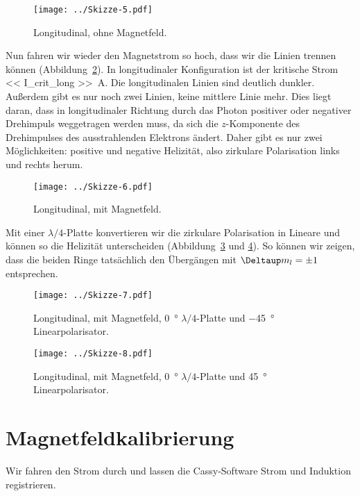 \begin{figure}[htbp]
    \centering
    \texttt{[image: ../Skizze-5.pdf]}
    \caption{%
        Longitudinal, ohne Magnetfeld.
    }
    \label{fig:Skizze-5}
\end{figure}

Nun fahren wir wieder den Magnetstrom so hoch, dass wir die Linien trennen
können (Abbildung~\ref{fig:Skizze-6}). In longitudinaler Konfiguration ist der
kritische Strom \SI{<< I_crit_long >>}{\ampere}. Die longitudinalen Linien sind
deutlich dunkler. Außerdem gibt es nur noch zwei Linien, keine mittlere Linie
mehr. Dies liegt daran, dass in longitudinaler Richtung durch das Photon
positiver oder negativer Drehimpuls weggetragen werden muss, da sich die
$z$-Komponente des Drehimpulses des ausstrahlenden Elektrons ändert. Daher gibt
es nur zwei Möglichkeiten: positive und negative Helizität, also zirkulare
Polarisation links und rechts herum.

\begin{figure}[htbp]
    \centering
    \texttt{[image: ../Skizze-6.pdf]}
    \caption{%
        Longitudinal, mit Magnetfeld.
    }
    \label{fig:Skizze-6}
\end{figure}

Mit einer $\lambda/4$-Platte konvertieren wir die zirkulare Polarisation in
Lineare und können so die Helizität unterscheiden (Abbildung~\ref{fig:Skizze-7}
und \ref{fig:Skizze-8}). So können wir zeigen, dass die beiden Ringe
tatsächlich den Übergängen mit $\Deltaup m_l = \pm 1$ entsprechen.

\begin{figure}[htbp]
    \centering
    \texttt{[image: ../Skizze-7.pdf]}
    \caption{%
        Longitudinal, mit Magnetfeld, \SI{0}{\degree} $\lambda/4$-Platte und
        \SI{-45}{\degree} Linearpolarisator.
    }
    \label{fig:Skizze-7}
\end{figure}

\begin{figure}[htbp]
    \centering
    \texttt{[image: ../Skizze-8.pdf]}
    \caption{%
        Longitudinal, mit Magnetfeld, \SI{0}{\degree} $\lambda/4$-Platte und
        \SI{+45}{\degree} Linearpolarisator.
    }
    \label{fig:Skizze-8}
\end{figure}

\section{Magnetfeldkalibrierung}

Wir fahren den Strom durch und lassen die Cassy-Software Strom und Induktion
registrieren.


